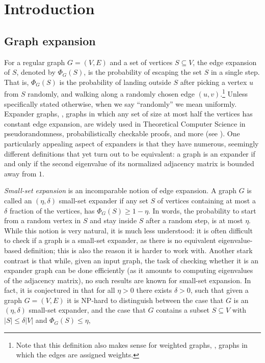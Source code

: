 \documentclass{toc}
\newcommand\card[1]{\left| {#1} \right|}
\renewcommand\geq{\geqslant}
\renewcommand\leq{\leqslant}
\begin{document}
\section{Introduction}
\subsection{Graph expansion}
For a regular graph $G=(V,E)$ and a set of vertices $S\subseteq V$, the edge expansion of $S$, denoted by
$\Phi_G(S)$, is the probability of escaping the set $S$ in a single step.
%
%
%
That is, $\Phi_G(S)$ is the probability of landing outside $S$
after picking a vertex $u$ from $S$ randomly, and walking along a randomly chosen edge $(u,v)$.\footnote{Note that this definition also makes sense for weighted graphs, \ie, graphs in which the edges are assigned weights.}
Unless specifically stated otherwise, when we say ``randomly'' we mean uniformly. %
Expander graphs, \ie, graphs in which any set of size at most half the vertices has
constant edge expansion, are widely used in Theoretical Computer Science in
pseudorandomness, probabilistically checkable proofs,
and more (see \cite{HLW}). One particularly appealing aspect of
expanders %
is that they have numerous,
seemingly different definitions  %
that yet turn out to be equivalent: a graph is an expander %
if and only if the second eigenvalue of its normalized adjacency
matrix is bounded away from $1$.

%

\emph{Small-set expansion} %
is an incomparable notion of edge expansion. A graph $G$ is called an $(\eta,\delta)$
small-set expander
if any set %
$S$ of vertices  %
containing at most
a  %
$\delta$ fraction of the vertices, has $\Phi_G(S)\geq 1-\eta$. In words, the
probability  %
%
%
to start from a random vertex in $S$ and stay inside $S$ after a random step, is at most $\eta$.
While this notion is very natural, it is much less understood:
it is often %
difficult  %
to check if a graph is a small-set expander, as there is no equivalent %
eigenvalue-based definition; %
%
%
%
%
%
%
%
%
%
%
%
%
%
%
%
%
this is also the reason it is harder to work with. %
Another stark contrast is that while, given an input graph, the task of
checking whether it is an expander graph
%
can be done efficiently (as it amounts to computing eigenvalues of the adjacency matrix),
no such results are known for small-set expansion.  %
%
%
In fact, it is conjectured in \cite{RagSteurer,RagSteurerTuls} that for all $\eta>0$ there
exists $\delta>0$, such that given a graph $G = (V,E)$
it is NP-hard to distinguish between the case that
$G$ is an $(\eta,\delta)$ small-set expander, and
the case that $G$ contains a subset $S\subseteq V$ with
$\card{S}\leq \delta \card{V}$ and $\Phi_G(S)\leq \eta$,
%
%
%
%
%
%
%
\end{document}

